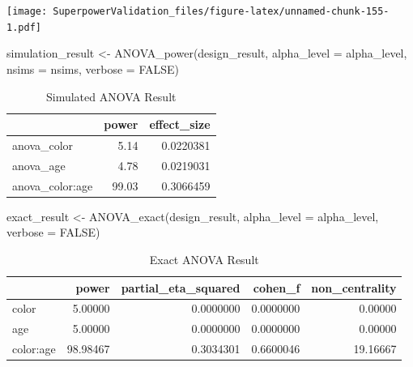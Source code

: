 \documentclass[
]{book}
\newenvironment{Shaded}{\begin{snugshade}}{\end{snugshade}}
\newcommand{\AttributeTok}[1]{\textcolor[rgb]{0.77,0.63,0.00}{#1}}
\newcommand{\ConstantTok}[1]{\textcolor[rgb]{0.00,0.00,0.00}{#1}}
\newcommand{\FunctionTok}[1]{\textcolor[rgb]{0.00,0.00,0.00}{#1}}
\newcommand{\NormalTok}[1]{#1}
\newcommand{\OtherTok}[1]{\textcolor[rgb]{0.56,0.35,0.01}{#1}}
\begin{document}
\texttt{[image: SuperpowerValidation\_files/figure-latex/unnamed-chunk-155-1.pdf]}

\begin{Shaded}
\begin{Highlighting}[]
\NormalTok{simulation\_result }\OtherTok{\textless{}{-}} \FunctionTok{ANOVA\_power}\NormalTok{(design\_result, }
                                 \AttributeTok{alpha\_level =}\NormalTok{ alpha\_level, }
                                 \AttributeTok{nsims =}\NormalTok{ nsims,}
                                 \AttributeTok{verbose =} \ConstantTok{FALSE}\NormalTok{)}
\end{Highlighting}
\end{Shaded}

\begin{table}[!h]

\caption{\label{tab:unnamed-chunk-157}Simulated ANOVA Result}
\centering
\begin{tabular}[t]{l|r|r}
\hline
  & power & effect\_size\\
\hline
anova\_color & 5.14 & 0.0220381\\
\hline
anova\_age & 4.78 & 0.0219031\\
\hline
anova\_color:age & 99.03 & 0.3066459\\
\hline
\end{tabular}
\end{table}

\begin{Shaded}
\begin{Highlighting}[]
\NormalTok{exact\_result }\OtherTok{\textless{}{-}} \FunctionTok{ANOVA\_exact}\NormalTok{(design\_result,}
                            \AttributeTok{alpha\_level =}\NormalTok{ alpha\_level,}
                            \AttributeTok{verbose =} \ConstantTok{FALSE}\NormalTok{)}
\end{Highlighting}
\end{Shaded}

\begin{table}[!h]

\caption{\label{tab:unnamed-chunk-159}Exact ANOVA Result}
\centering
\begin{tabular}[t]{l|r|r|r|r}
\hline
  & power & partial\_eta\_squared & cohen\_f & non\_centrality\\
\hline
color & 5.00000 & 0.0000000 & 0.0000000 & 0.00000\\
\hline
age & 5.00000 & 0.0000000 & 0.0000000 & 0.00000\\
\hline
color:age & 98.98467 & 0.3034301 & 0.6600046 & 19.16667\\
\hline
\end{tabular}
\end{table}
\end{document}
